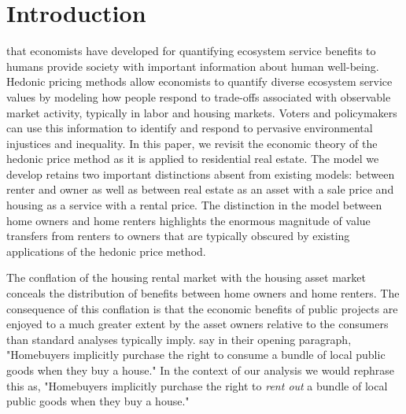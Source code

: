 \documentclass[ecta,nameyear,draft]{econsocart}
\theoremstyle{plain}
\theoremstyle{remark}
\begin{document}
\section{Introduction}
 that economists have developed for quantifying ecosystem service benefits to humans provide society with important information about human well-being. Hedonic pricing methods allow economists to quantify diverse ecosystem service values by modeling how people respond to trade-offs associated with observable market activity, typically in labor and housing markets. Voters and policymakers can use this information to identify and respond to pervasive environmental injustices and inequality. In this paper, we revisit the economic theory of the hedonic price method as it is applied to residential real estate. The model we develop retains two important distinctions absent from existing models: between renter and owner as well as between real estate as an asset with a sale price and housing as a service with a rental price. The distinction in the model between home owners and home renters highlights the enormous magnitude of value transfers from renters to owners that are typically obscured by existing applications of the hedonic price method.


The conflation of the housing rental market with the housing asset market conceals the distribution of benefits between home owners and home renters. The consequence of this conflation is that the economic benefits of public projects are enjoyed to a much greater extent by the asset owners relative to the consumers than standard analyses typically imply. \cite{kuminoffpope14} say in their opening paragraph, "Homebuyers implicitly purchase the right to consume a bundle of local public goods when they buy a house." In the context of our analysis we would rephrase this as, "Homebuyers implicitly purchase the right to \textit{rent out} a bundle of local public goods when they buy a house."
\end{document}
